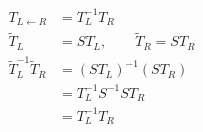 \documentclass[border=7pt]{standalone}
\begin{document}
\color{ink}
$\displaystyle \begin{aligned}T_{L\leftarrow R}&=T_L^{-1}T_R\\ \widetilde T_L&=ST_L,\qquad\widetilde T_R=ST_R\\ \widetilde T_L^{-1}\widetilde T_R&=(ST_L)^{-1}(ST_R)\\ &=T_L^{-1}S^{-1}ST_R\\ &=T_L^{-1}T_R\end{aligned}$
\end{document}
